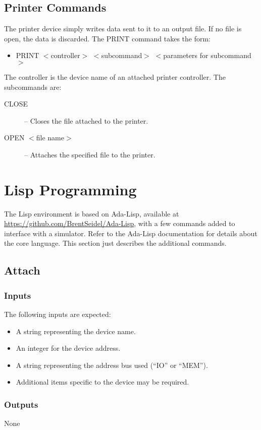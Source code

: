 \documentclass[10pt, openany]{book}
\begin{document}
\subsection{Printer Commands}
The printer device simply writes data sent to it to an output file.  If no file is open, the data is discarded.   The PRINT command takes the form:
\begin{itemize}
  \item PRINT $<$controller$>$ $<$subcommand$>$ $<$parameters for subcommand$>$
\end{itemize}
The controller is the device name of an attached printer controller.  The subcommands are:
\begin{description}
  \item[CLOSE]  -- Closes the file attached to the printer.
  \item[OPEN  $<$file name$>$] --  Attaches the specified file to the printer.
\end{description}


\section{Lisp Programming}
The Lisp environment is based on Ada-Lisp, available at \url{https://github.com/BrentSeidel/Ada-Lisp}, with a few commands added to interface with a simulator.  Refer to the Ada-Lisp documentation for details about the core language.  This section just describes the additional commands.

\subsection{Attach}
\subsubsection{Inputs}
The following inputs are expected:
\begin{itemize}
  \item A string representing the device name.
  \item An integer for the device address.
  \item A string representing the address bus used (``IO'' or ``MEM'').
  \item Additional items specific to the device may be required.
\end{itemize}
\subsubsection{Outputs}
None
\end{document}
